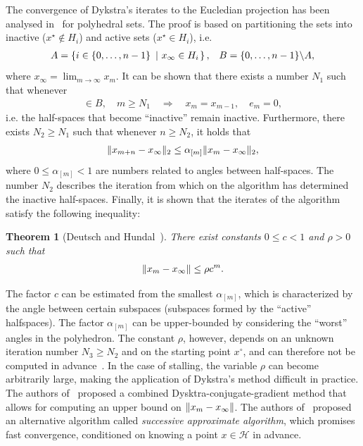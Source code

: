 \documentclass[hidelinks]{article}
\newtheorem{theorem}{Theorem}
\begin{document}
The convergence of Dykstra's iterates to the Eucledian projection has been analysed in~\cite{DYKSTRAPOLY2,DYKSTRAPOLY,DYKSTRAPERKINS} for polyhedral sets. The proof is based on partitioning the sets into inactive ($x^\star\not\in H_i$) and active sets ($x^\star\in H_i$), i.e.\
\begin{align}
&A=\left\{ i\in\lbrace 0,\dots,n-1\rbrace\ \left| \ x_\infty\in H_i \right. \right\},
&B=\lbrace 0,\dots,n-1\rbrace\backslash A,
\end{align}
where $x_\infty=\lim_{m\rightarrow\infty}x_m$. It can be shown that there exists a number $N_1$ such that whenever
\begin{align}
[m]\in B,\quad m\geq N_1\quad\Rightarrow\quad x_m=x_{m-1},\quad e_m=0,
\end{align}
i.e. the half-spaces that become ``inactive'' remain inactive. Furthermore, there exists $N_2\geq N_1$ such that whenever $n\geq N_2$, it holds that
\begin{align}\label{eq:dykstra:error:poly}
\Vert x_{m+n}-x_\infty \Vert_2\leq\alpha_{[m]}\Vert x_m-x_\infty \Vert_2,
\end{align}
where $0\leq\alpha_{[m]}<1$ are numbers related to angles between half-spaces. The number $N_2$ describes the iteration from which on the algorithm has determined the inactive half-spaces. Finally, it is shown that the iterates of the algorithm satisfy the following inequality:
\begin{theorem}[Deutsch and Hundal~\cite{DYKSTRAPOLY}]
There exist constants $0\leq c < 1$ and $\rho > 0$ such that
\begin{align*}
\Vert x_m -x_\infty \Vert \leq \rho c^m.
\end{align*}
\end{theorem}
The factor $c$ can be estimated from the smallest $\alpha_{[m]}$, which is characterized by the angle between certain subspaces (subspaces formed by the ``active'' halfspaces). The factor $\alpha_{[m]}$ can be upper-bounded by considering the ``worst'' angles in the polyhedron. The constant $\rho$, however, depends on an unknown iteration number $N_3\geq N_2$ and on the starting point $x^\circ$, and can therefore not be computed in advance~\cite{DYKSTRAPERKINS,XUPOLY}. In the case of stalling, the variable $\rho$ can become arbitrarily large, making the application of Dykstra's method difficult in practice. The authors of~\cite{DYKSTRAPERKINS} proposed a combined Dysktra-conjugate-gradient method that allows for computing an upper bound on $\Vert x_m -x_\infty \Vert$. The authors of~\cite{XUPOLY} proposed an alternative algorithm called \emph{successive approximate algorithm}, which promises fast convergence, conditioned on knowing a point $x\in\mathcal{H}$ in advance.
\end{document}
